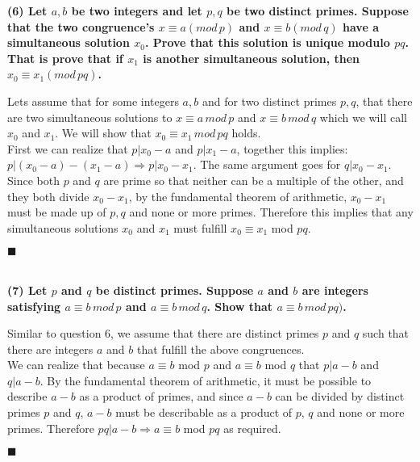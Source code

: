 \documentclass[20pt]{article}
\begin{document}
\noindent
\textbf{(6) Let $a, b$ be two integers and let $p, q$ be two distinct primes. Suppose that the two congruence's $x \equiv a (mod \,p)$ and $x \equiv b (mod \,q)$ have a simultaneous solution $x_0$. Prove that this solution is unique modulo $pq$. That is prove that if $x_1$ is another simultaneous solution, then $x_0 \equiv x_1 (mod \,pq)$.}\\
\begin{text}
    \noindent
    Lets assume that for some integers $a, b$ and for two distinct primes $p, q$, that there are two simultaneous solutions to $x \equiv a \, mod \, p$ and $x \equiv b \, mod \,q$ which we will call $x_0$ and $x_1$. We will show that $x_0 \equiv x_1 \, mod \, pq$ holds.\\
    
    \noindent
    First we can realize that $p | x_0 - a$ and $p | x_1 - a$, together this implies: $p | (x_0 - a) - (x_1 - a) \Longrightarrow p | x_0 - x_1$. The same argument goes for $q | x_0 - x_1$.\\
    
    \noindent
    Since both $p$ and $q$ are prime so that neither can be a multiple of the other, and they both divide $x_0 - x_1$, by the fundamental theorem of arithmetic, $x_0 - x_1$ must be made up of $p, q$ and none or more primes. Therefore this implies that any simultaneous solutions $x_0$ and $x_1$ must fulfill $x_0 \equiv x_1$ mod $pq$.
    
    \hfill $\blacksquare$
\end{text}\\

\noindent
\textbf{(7) Let $p$ and $q$ be distinct primes. Suppose $a$ and $b$ are integers satisfying $a \equiv b \, mod \, p$ and $a \equiv b \, mod \, q$. Show that $a \equiv b \, mod \, pq)$.}
\begin{text}
    \noindent
    Similar to question 6, we assume that there are distinct primes $p$ and $q$ such that there are integers $a$ and $b$ that fulfill the above congruences.\\
    
    \noindent
    We can realize that because $a \equiv b$ mod $p$ and $a \equiv b$ mod $q$ that $p | a - b$ and $q | a - b$. By the fundamental theorem of arithmetic, it must be possible to describe $a - b$ as a product of primes, and since $a - b$ can be divided by distinct primes $p$ and $q$, $a - b$ must be describable as a product of $p$, $q$ and none or more primes. Therefore $pq | a - b \Longrightarrow a \equiv b$ mod $pq$ as required.
    
    \hfill $\blacksquare$
\end{text}\\
\end{document}
